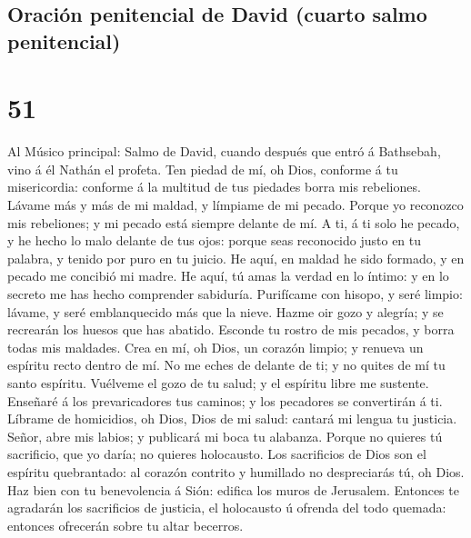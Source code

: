 \hypertarget{oraciuxf3n-penitencial-de-david-cuarto-salmo-penitencial}{%
\subsection{Oración penitencial de David (cuarto salmo
penitencial)}\label{oraciuxf3n-penitencial-de-david-cuarto-salmo-penitencial}}

\hypertarget{section-50}{%
\section{51}\label{section-50}}

 Al Músico principal: Salmo de David, cuando después que
entró á Bathsebah, vino á él Nathán el profeta. Ten piedad de mí, oh
Dios, conforme á tu misericordia: conforme á la multitud de tus piedades
borra mis rebeliones.  Lávame más y más de mi maldad, y
límpiame de mi pecado.  Porque yo reconozco mis
rebeliones; y mi pecado está siempre delante de mí.  A ti,
á ti solo he pecado, y he hecho lo malo delante de tus ojos: porque seas
reconocido justo en tu palabra, y tenido por puro en tu juicio.
 He aquí, en maldad he sido formado, y en pecado me
concibió mi madre.  He aquí, tú amas la verdad en lo
íntimo: y en lo secreto me has hecho comprender sabiduría.
 Purifícame con hisopo, y seré limpio: lávame, y seré
emblanquecido más que la nieve.  Hazme oir gozo y alegría;
y se recrearán los huesos que has abatido.  Esconde tu
rostro de mis pecados, y borra todas mis maldades.  Crea
en mí, oh Dios, un corazón limpio; y renueva un espíritu recto dentro de
mí.  No me eches de delante de ti; y no quites de mí tu
santo espíritu.  Vuélveme el gozo de tu salud; y el
espíritu libre me sustente.  Enseñaré á los
prevaricadores tus caminos; y los pecadores se convertirán á ti.
 Líbrame de homicidios, oh Dios, Dios de mi salud:
cantará mi lengua tu justicia.  Señor, abre mis labios; y
publicará mi boca tu alabanza.  Porque no quieres tú
sacrificio, que yo daría; no quieres holocausto.  Los
sacrificios de Dios son el espíritu quebrantado: al corazón contrito y
humillado no despreciarás tú, oh Dios.  Haz bien con tu
benevolencia á Sión: edifica los muros de Jerusalem. 
Entonces te agradarán los sacrificios de justicia, el holocausto ú
ofrenda del todo quemada: entonces ofrecerán sobre tu altar becerros.

